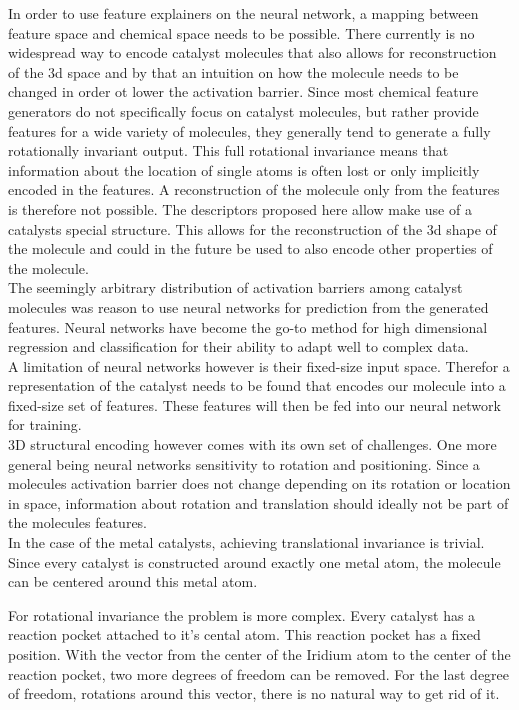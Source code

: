 In order to use feature explainers on the neural network, a mapping between feature space and chemical space needs to be possible.
There currently is no widespread way to encode catalyst molecules that also allows for 
reconstruction of the 3d space and by that an intuition on how the molecule needs to be changed in order ot lower the activation barrier.
Since most chemical feature generators do not specifically focus on catalyst molecules,
but rather provide features for a wide variety of molecules, they generally tend to generate a fully rotationally invariant output.
This full rotational invariance means that information about the location of single atoms is often lost or only implicitly encoded in the features.
A reconstruction of the molecule only from the features is therefore not possible.
The descriptors proposed here allow make use of a catalysts special structure.
This allows for the reconstruction of the 3d shape of the molecule and could in the future be used to also encode 
other properties of the molecule.
\\
The seemingly arbitrary distribution of activation barriers among catalyst molecules  was reason to use neural networks for prediction from the generated features.
Neural networks have become the go-to method for high dimensional regression and classification for their ability to adapt well to complex data.
\\
A limitation of neural networks however is their fixed-size input space.
Therefor a representation of the catalyst needs to be found that encodes our molecule into a fixed-size set of features.
These features will then be fed into our neural network for training. 
\\
3D structural encoding however comes with its own set of challenges. 
One more general being neural networks sensitivity to rotation and positioning.
Since a molecules activation barrier does not change depending on its rotation or location in space, 
information about rotation and translation should ideally not be part of the molecules features.
\\
In the case of the metal catalysts, achieving translational invariance is trivial.
Since every catalyst is constructed around exactly one metal atom, the molecule can be centered around this metal atom.

For rotational invariance the problem is more complex.
Every catalyst has a reaction pocket attached to it's cental atom.
This reaction pocket has a fixed position.
With the vector from the center of the Iridium atom to the center of the reaction pocket, two more degrees of freedom can be removed.
For the last degree of freedom, rotations around this vector, there is no natural way to get rid of it.

